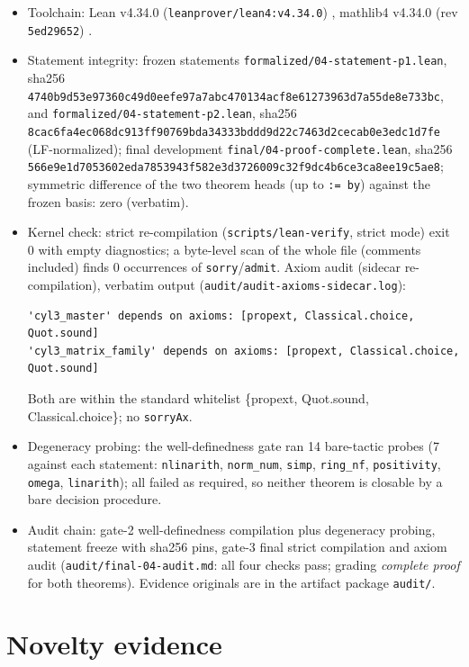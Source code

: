 \documentclass[11pt]{article}
\begin{document}
\begin{itemize}
\item Toolchain: Lean v4.34.0 (\texttt{leanprover/lean4:v4.34.0})
\cite{lean4}, mathlib4 v4.34.0 (rev \texttt{5ed29652}) \cite{mathlib}.
\item Statement integrity: frozen statements
\texttt{formalized/04-statement-p1.lean}, sha256
\texttt{4740b9d53e97360c49d0eefe97a7abc470134acf8e61273963d7a55de8e733bc},
and \texttt{formalized/04-statement-p2.lean}, sha256
\texttt{8cac6fa4ec068dc913ff90769bda34333bddd9d22c7463d2cecab0e3edc1d7fe}
(LF-normalized); final development
\texttt{final/04-proof-complete.lean}, sha256
\texttt{566e9e1d7053602eda7853943f582e3d3726009c32f9dc4b6ce3ca8ee19c5ae8};
symmetric difference of the two theorem heads (up to \texttt{:= by})
against the frozen basis: zero (verbatim).
\item Kernel check: strict re-compilation (\texttt{scripts/lean-verify},
strict mode) exit 0 with empty diagnostics; a byte-level scan of the whole
file (comments included) finds 0 occurrences of
\texttt{sorry}/\texttt{admit}. Axiom audit (sidecar re-compilation),
verbatim output (\texttt{audit/audit-axioms-sidecar.log}):
\begin{verbatim}
'cyl3_master' depends on axioms: [propext, Classical.choice, Quot.sound]
'cyl3_matrix_family' depends on axioms: [propext, Classical.choice, Quot.sound]
\end{verbatim}
Both are within the standard whitelist \{propext, Quot.sound,
Classical.choice\}; no \texttt{sorryAx}.
\item Degeneracy probing: the well-definedness gate ran 14 bare-tactic
probes (7 against each statement: \texttt{nlinarith}, \texttt{norm\_num},
\texttt{simp}, \texttt{ring\_nf}, \texttt{positivity}, \texttt{omega},
\texttt{linarith}); all failed as required, so neither theorem is closable
by a bare decision procedure.
\item Audit chain: gate-2 well-definedness compilation plus degeneracy
probing, statement freeze with sha256 pins, gate-3 final strict compilation
and axiom audit (\texttt{audit/final-04-audit.md}: all four checks pass;
grading \emph{complete proof} for both theorems). Evidence originals are in
the artifact package \texttt{audit/}.
\end{itemize}

\section{Novelty evidence}
\end{document}
